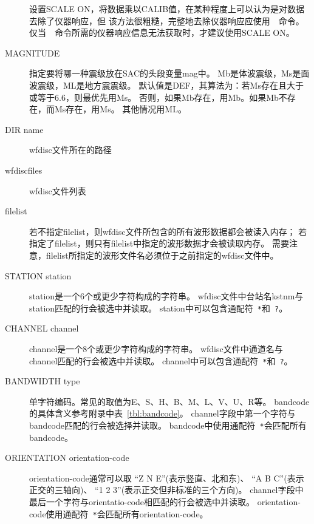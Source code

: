 \begin{description}
    设置SCALE ON，将数据乘以CALIB值，在某种程度上可以认为是对数据去除了仪器响应，但
    该方法很粗糙，完整地去除仪器响应应使用~~命令。
    仅当~~命令所需的仪器响应信息无法获取时，才建议使用SCALE ON。
\item [MAGNITUDE] 指定要将哪一种震级放在SAC的头段变量mag中。
    Mb是体波震级，Ms是面波震级，ML是地方震震级。
    默认值是DEF，其算法为：若Ms存在且大于或等于6.6，则最优先用Ms。
    否则，如果Mb存在，用Mb。如果Mb不存在，而Ms存在，用Ms。
    其他情况用ML。
\item [DIR name] wfdisc文件所在的路径
\item [wfdiscfiles] wfdisc文件列表
\item [filelist] 若不指定filelist，则wfdisc文件所包含的所有波形数据都会被读入内存；
    若指定了filelist，则只有filelist中指定的波形数据才会被读取内存。
    需要注意，filelist所指定的波形文件名必须位于之前指定的wfdisc文件中。
\item[STATION station] station是一个6个或更少字符构成的字符串。
    wfdisc文件中台站名kstnm与station匹配的行会被选中并读取。
    station中可以包含通配符~\verb+*+和~\verb+?+。
\item[CHANNEL channel]  channel是一个8个或更少字符构成的字符串。
    wfdisc文件中通道名与channel匹配的行会被选中并读取。
    channel中可以包含通配符~\verb+*+和~\verb+?+。
\item [BANDWIDTH type] 单字符编码。常见的取值为E、S、H、B、M、L、V、U、R等。
    bandcode的具体含义参考附录中表~\ref{tbl:bandcode}。
    channel字段中第一个字符与bandcode匹配的行会被选择并读取。
    bandcode中使用通配符~\verb+*+会匹配所有bandcode。
\item [ORIENTATION orientation-code] orientation-code通常可以取
    ``Z N E''(表示竖直、北和东)、
    ``A B C''(表示正交的三轴向)、
    ``1 2 3''(表示正交但非标准的三个方向)。
    channel字段中最后一个字符与orientatio-code相匹配的行会被选中并读取。
    orientation-code使用通配符~\verb+*+会匹配所有orientation-code。
\end{description}

